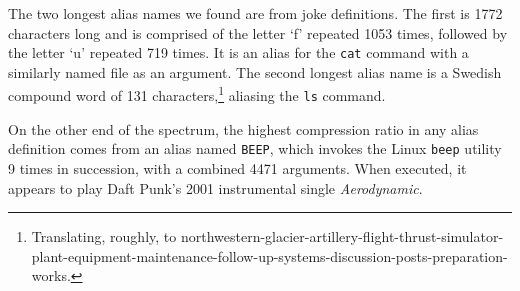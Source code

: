 The two longest alias names we found are from joke definitions.
The first is \num{1772} characters long and is comprised of the letter `f' repeated \num{1053} times, followed by the letter `u' repeated \num{719} times.
It is an alias for the \texttt{cat} command with a similarly named file as an argument.
The second longest alias name is a Swedish compound word of \num{131} characters,\footnote{Translating, roughly, to northwestern-glacier-artillery-flight-thrust-simulator-plant-equipment-maintenance-follow-up-systems-discussion-posts-preparation-works.} aliasing the \texttt{ls} command.

On the other end of the spectrum, the highest compression ratio in any alias definition comes from an alias named \texttt{BEEP}, which invokes the Linux \texttt{beep} utility 9 times in succession, with a combined \num{4471} arguments.
When executed, it appears to play Daft Punk's 2001 instrumental single \emph{Aerodynamic}.
